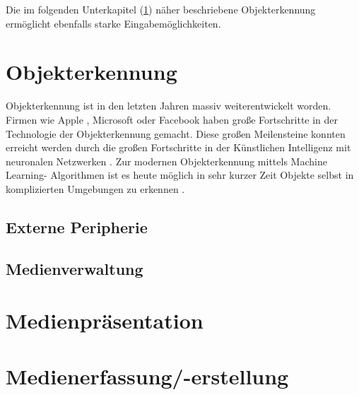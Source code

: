 Die im folgenden Unterkapitel (\ref{sec:Objekterkennung}) näher beschriebene Objekterkennung ermöglicht ebenfalls starke Eingabemöglichkeiten.

%
%
\section{Objekterkennung}
\label{sec:Objekterkennung}
Objekterkennung ist in den letzten Jahren massiv weiterentwickelt worden. Firmen wie Apple \cite{Apple2018b}, Microsoft \cite{Girshick2015} oder Facebook \cite{Schroepfer2015} haben große Fortschritte in der Technologie der Objekterkennung gemacht. Diese großen Meilensteine konnten erreicht werden durch die großen Fortschritte in der Künstlichen Intelligenz mit neuronalen Netzwerken \cite{Apple2018b, Schroepfer2015}. Zur modernen Objekterkennung mittels Machine Learning- Algorithmen ist es heute möglich in sehr kurzer Zeit Objekte selbst in komplizierten Umgebungen zu erkennen \cite{Schroepfer2015}. 


%
%
\subsection{Externe Peripherie}
\label{sec:Externe_Peripherie}
%
%
\subsection{Medienverwaltung}
\label{sec:Medienverwaltung}
%
%
\section{Medienpräsentation}
\label{sec:Medienpraesentation}
%
%
\section{Medienerfassung/-erstellung}
\label{sec:Medienerfassung_-erstellung}
